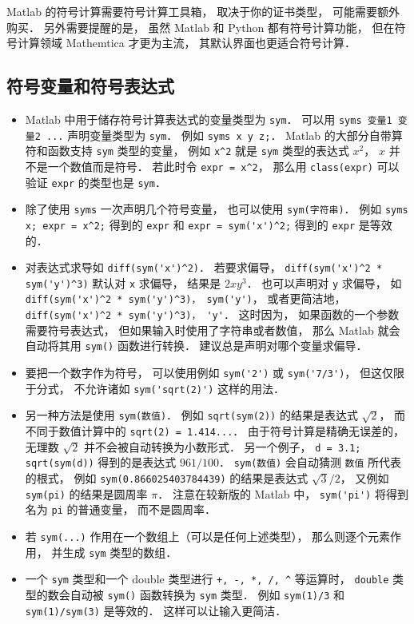 

Matlab 的符号计算需要符号计算工具箱， 取决于你的证书类型， 可能需要额外购买． 另外需要提醒的是， 虽然 Matlab 和 Python 都有符号计算功能， 但在符号计算领域 Mathemtica 才更为主流， 其默认界面也更适合符号计算．

\subsection{符号变量和符号表达式}
\begin{itemize}
\item Matlab 中用于储存符号计算表达式的变量类型为 \verb|sym|． 可以用 \verb|syms 变量1 变量2 ...| 声明变量类型为 \verb|sym|． 例如 \verb|syms x y z;|． Matlab 的大部分自带算符和函数支持 \verb|sym| 类型的变量， 例如 \verb|x^2| 就是 \verb|sym| 类型的表达式 $x^2$， $x$ 并不是一个数值而是符号． 若此时令 \verb|expr = x^2|， 那么用 \verb|class(expr)| 可以验证 \verb|expr| 的类型也是 \verb|sym|．

\item 除了使用 \verb|syms| 一次声明几个符号变量， 也可以使用 \verb|sym(字符串)|． 例如 \verb|syms x; expr = x^2;| 得到的 \verb|expr| 和 \verb|expr = sym('x')^2;| 得到的 \verb|expr| 是等效的．

\item  对表达式求导如 \verb|diff(sym('x')^2)|． 若要求偏导， \verb|diff(sym('x')^2 * sym('y')^3)| 默认对 \verb|x| 求偏导， 结果是 $2x y^3$． 也可以声明对 \verb|y| 求偏导， 如 \verb|diff(sym('x')^2 * sym('y')^3)， sym('y')|， 或者更简洁地， \verb|diff(sym('x')^2 * sym('y')^3)， 'y'|． 这时因为， 如果函数的一个参数需要符号表达式， 但如果输入时使用了字符串或者数值， 那么 Matlab 就会自动将其用 \verb|sym()| 函数进行转换． 建议总是声明对哪个变量求偏导．

\item  要把一个数字作为符号， 可以使用例如 \verb|sym('2')| 或 \verb|sym('7/3')|， 但这仅限于分式， 不允许诸如 \verb|sym('sqrt(2)')| 这样的用法．

\item 另一种方法是使用 \verb|sym(数值)|． 例如 \verb|sqrt(sym(2))| 的结果是表达式 $\sqrt 2$， 而不同于数值计算中的 \verb|sqrt(2) = 1.414...|． 由于符号计算是精确无误差的， 无理数 $\sqrt{2}$ 并不会被自动转换为小数形式． 另一个例子， \verb|d = 3.1; sqrt(sym(d))| 得到的是表达式 $961/100$． \verb|sym(数值)| 会自动猜测 \verb|数值| 所代表的根式， 例如 \verb|sym(0.866025403784439)| 的结果是表达式 $\sqrt{3}/2$， 又例如 \verb|sym(pi)| 的结果是圆周率 $\pi$． 注意在较新版的 Matlab 中， \verb|sym('pi')| 将得到名为 \verb|pi| 的普通变量， 而不是圆周率．

\item 若 \verb|sym(...)| 作用在一个数组上（可以是任何上述类型）， 那么则逐个元素作用， 并生成 \verb|sym| 类型的数组．

\item 一个 \verb|sym| 类型和一个 double 类型进行 \verb|+, -, *, /, ^| 等运算时， \verb|double| 类型的数会自动被 \verb|sym()| 函数转换为 \verb|sym| 类型． 例如 \verb|sym(1)/3| 和 \verb|sym(1)/sym(3)| 是等效的． 这样可以让输入更简洁．
\end{itemize}

